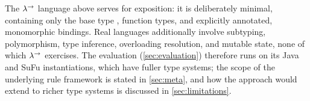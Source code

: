\smallskip
\noindent The $\lambda^{\rightarrow}$ language above serves for exposition: it is deliberately minimal, containing only the base type , function types, and explicitly annotated, monomorphic bindings. Real languages additionally involve subtyping, polymorphism, type inference, overloading resolution, and mutable state, none of which $\lambda^{\rightarrow}$ exercises. The evaluation (\autoref{sec:evaluation}) therefore runs \mainname{} on its Java and SuFu instantiations, which have fuller type systems; the scope of the underlying rule framework is stated in \autoref{sec:meta}, and how the approach would extend to richer type systems is discussed in \autoref{sec:limitations}.